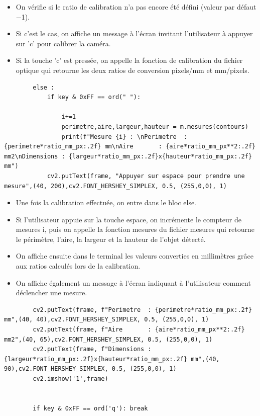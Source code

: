 \documentclass[titlepage]{article}
\begin{document}
	\begin{itemize}
		\item 
		On vérifie si le ratio de calibration n'a pas encore été défini (valeur par défaut −1).
		\item
		Si c'est le cas, on affiche un message à l'écran invitant l'utilisateur à appuyer sur 'c' pour calibrer la caméra.
		\item
		Si la touche 'c' est pressée, on appelle la fonction de calibration du fichier optique qui retourne les deux ratios de conversion pixels/mm et mm/pixels.
	\end{itemize}
	\begin{lstlisting}
		else :
			if key & 0xFF == ord(" "):
				
				i+=1
				perimetre,aire,largeur,hauteur = m.mesures(contours)
				print(f"Mesure {i} : \nPerimetre  : {perimetre*ratio_mm_px:.2f} mm\nAire       : {aire*ratio_mm_px**2:.2f} mm2\nDimensions : {largeur*ratio_mm_px:.2f}x{hauteur*ratio_mm_px:.2f} mm")
			cv2.putText(frame, "Appuyer sur espace pour prendre une mesure",(40, 200),cv2.FONT_HERSHEY_SIMPLEX, 0.5, (255,0,0), 1)
	\end{lstlisting}
	\begin{itemize}
		\item
		Une fois la calibration effectuée, on entre dans le bloc else.
		\item
		Si l'utilisateur appuie sur la touche espace, on incrémente le compteur de mesures i, puis on appelle la fonction mesures du fichier mesures qui retourne le périmètre, l'aire, la largeur et la hauteur de l'objet détecté.
		\item
		On affiche ensuite dans le terminal les valeurs converties en millimètres grâce aux ratios calculés lors de la calibration.
		\item
		On affiche également un message à l'écran indiquant à l'utilisateur comment déclencher une mesure.
	\end{itemize}
	\begin{lstlisting}
		cv2.putText(frame, f"Perimetre  : {perimetre*ratio_mm_px:.2f} mm",(40, 40),cv2.FONT_HERSHEY_SIMPLEX, 0.5, (255,0,0), 1)
		cv2.putText(frame, f"Aire       : {aire*ratio_mm_px**2:.2f} mm2",(40, 65),cv2.FONT_HERSHEY_SIMPLEX, 0.5, (255,0,0), 1)
		cv2.putText(frame, f"Dimensions : {largeur*ratio_mm_px:.2f}x{hauteur*ratio_mm_px:.2f} mm",(40, 90),cv2.FONT_HERSHEY_SIMPLEX, 0.5, (255,0,0), 1)
		cv2.imshow('1',frame)   
	
	
		if key & 0xFF == ord('q'): break 
	\end{lstlisting}
\end{document}
